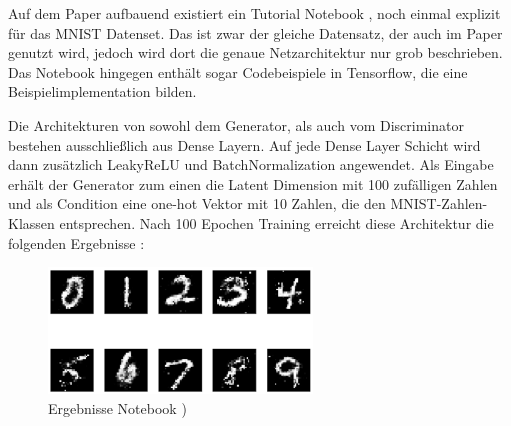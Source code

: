 Auf dem Paper aufbauend existiert ein Tutorial Notebook \cite{inspiration-dense-and-dc-gan}, noch einmal explizit für das MNIST Datenset.
Das ist zwar der gleiche Datensatz, der auch im Paper genutzt wird, jedoch wird dort die genaue Netzarchitektur nur grob beschrieben.
Das Notebook hingegen enthält sogar Codebeispiele in Tensorflow, die eine Beispielimplementation bilden.
\newline

Die Architekturen von sowohl dem Generator, als auch vom Discriminator bestehen ausschließlich aus Dense Layern.
Auf jede Dense Layer Schicht wird dann zusätzlich LeakyReLU und BatchNormalization angewendet.
Als Eingabe erhält der Generator zum einen die Latent Dimension mit 100 zufälligen Zahlen und als Condition eine one-hot Vektor mit 10 Zahlen, die den MNIST-Zahlen-Klassen entsprechen.
Nach 100 Epochen Training erreicht diese Architektur die folgenden Ergebnisse :

\begin{figure}[H]
	\centering
	\includegraphics[width=7cm]{kapitel/2_stand_der_technik/img/cgan-notebook-ergebnisse.png}
	\caption{Ergebnisse Notebook \cite{inspiration-dense-and-dc-gan}) }
\end{figure}

